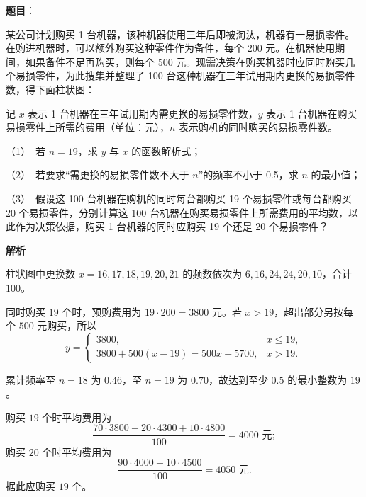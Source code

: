 \begin{answer}

\textbf{题目}：

某公司计划购买 1 台机器，该种机器使用三年后即被淘汰，机器有一易损零件。在购进机器时，可以额外购买这种零件作为备件，每个 200 元。在机器使用期间，如果备件不足再购买，则每个 500 元。现需决策在购买机器时应同时购买几个易损零件，为此搜集并整理了 100 台这种机器在三年试用期内更换的易损零件数，得下面柱状图：
\nopagebreak[4]
\begin{center}\end{center}
\nopagebreak[4]
   记 \(x\) 表示 1 台机器在三年试用期内需更换的易损零件数，\(y\) 表示 1 台机器在购买易损零件上所需的费用（单位：元），\(n\) 表示购机的同时购买的易损零件数。

   （1）　若 \(n=19\)，求 \(y\) 与 \(x\) 的函数解析式；

   （2）　若要求“需更换的易损零件数不大于 \(n\)”的频率不小于 0.5，求 \(n\) 的最小值；

   （3）　假设这 100 台机器在购机的同时每台都购买 19 个易损零件或每台都购买 20 个易损零件，分别计算这 100 台机器在购买易损零件上所需费用的平均数，以此作为决策依据，购买 1 台机器的同时应购买 19 个还是 20 个易损零件？

\textbf{解析}

柱状图中更换数 \(x=16,17,18,19,20,21\) 的频数依次为 \(6,16,24,24,20,10\)，合计 \(100\)。


同时购买 \(19\) 个时，预购费用为 \(19\cdot200=3800\) 元。若 \(x>19\)，超出部分另按每个 \(500\) 元购买，所以
\nopagebreak[4]
\[
y=\begin{cases}3800,&x\le19,\\3800+500(x-19)=500x-5700,&x>19.\end{cases}
\]


累计频率至 \(n=18\) 为 \(0.46\)，至 \(n=19\) 为 \(0.70\)，故达到至少 \(0.5\) 的最小整数为 \(19\)。


购买 \(19\) 个时平均费用为
\nopagebreak[4]
\[
\frac{70\cdot3800+20\cdot4300+10\cdot4800}{100}=4000\text{ 元};
\]
购买 \(20\) 个时平均费用为
\nopagebreak[4]
\[
\frac{90\cdot4000+10\cdot4500}{100}=4050\text{ 元}.
\]
据此应购买 \(19\) 个。




\end{answer}
